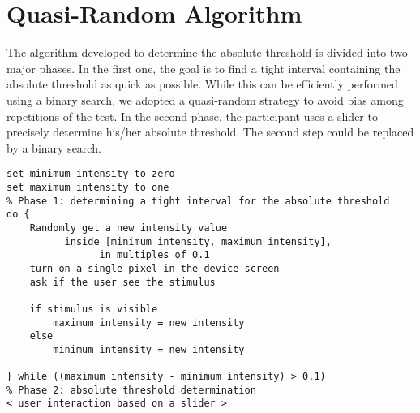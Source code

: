 
\section{Quasi-Random Algorithm}
\label{subsec:QuasiRandomAlgorithm}

The algorithm developed to determine the absolute threshold is divided into two major phases. In the first one, the goal is to find a tight interval containing the absolute threshold as quick as possible. While this can be efficiently performed using a binary search, we adopted a quasi-random strategy to avoid bias among repetitions of the test.
In the second phase, the participant uses a slider to precisely determine his/her absolute threshold. The second step could be replaced by a binary search.


\begin{lstlisting}[caption = {Estimating the absolute threshold for vision}]
set minimum intensity to zero
set maximum intensity to one
% Phase 1: determining a tight interval for the absolute threshold 
do {
	Randomly get a new intensity value 
	      inside [minimum intensity, maximum intensity], 
				in multiples of 0.1
	turn on a single pixel in the device screen
	ask if the user see the stimulus
	
	if stimulus is visible
		maximum intensity = new intensity
	else
		minimum intensity = new intensity
	
} while ((maximum intensity - minimum intensity) > 0.1)
% Phase 2: absolute threshold determination
< user interaction based on a slider >
\end{lstlisting}